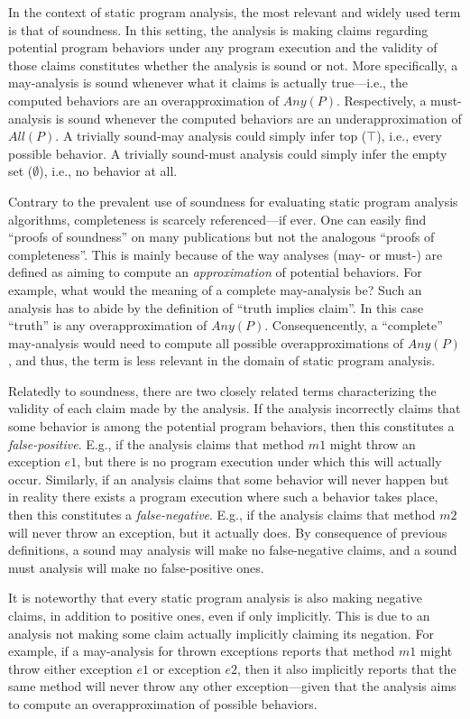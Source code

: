 In the context of static program analysis, the most relevant and widely used term is that of soundness. In this setting, the analysis is making claims regarding potential program behaviors under any program execution and the validity of those claims constitutes whether the analysis is sound or not. More specifically, a may-analysis is sound whenever what it claims is actually true---i.e., the computed behaviors are an overapproximation of $Any(P)$. Respectively, a must-analysis is sound whenever the computed behaviors are an underapproximation of $All(P)$. A trivially sound-may analysis could simply infer top ($\top$), i.e., every possible behavior. A trivially sound-must analysis could simply infer the empty set ($\emptyset$), i.e., no behavior at all.

Contrary to the prevalent use of soundness for evaluating static program analysis algorithms, completeness is scarcely referenced---if ever. One can easily find ``proofs of soundness'' on many publications but not the analogous ``proofs of completeness''. This is mainly because of the way analyses (may- or must-) are defined as aiming to compute an \emph{approximation} of potential behaviors. For example, what would the meaning of a complete may-analysis be? Such an analysis has to abide by the definition of ``truth implies claim''. In this case ``truth'' is any overapproximation of $Any(P)$. Consequencently, a ``complete'' may-analysis would need to compute all possible overapproximations of $Any(P)$, and thus, the term is less relevant in the domain of static program analysis.

Relatedly to soundness, there are two closely related terms characterizing the validity of each claim made by the analysis. If the analysis incorrectly claims that some behavior is among the potential program behaviors, then this constitutes a \emph{false-positive}. E.g., if the analysis claims that method $m1$ might throw an exception $e1$, but there is no program execution under which this will actually occur. Similarly, if an analysis claims that some behavior will never happen but in reality there exists a program execution where such a behavior takes place, then this constitutes a \emph{false-negative}. E.g., if the analysis claims that method $m2$ will never throw an exception, but it actually does. By consequence of previous definitions, a sound may analysis will make no false-negative claims, and a sound must analysis will make no false-positive ones.

It is noteworthy that every static program analysis is also making negative claims, in addition to positive ones, even if only implicitly. This is due to an analysis not making some claim actually implicitly claiming its negation. For example, if a may-analysis for thrown exceptions reports that method $m1$ might throw either exception $e1$ or exception $e2$, then it also implicitly reports that the same method will never throw any other exception---given that the analysis aims to compute an overapproximation of possible behaviors.


